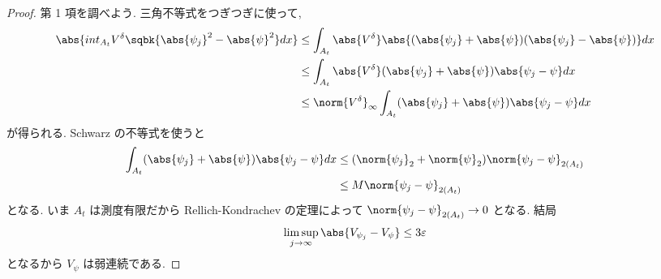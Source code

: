 \documentclass[openany, a4paper, oneside]{jsbook}
\begin{document}
\begin{proof}
第 1 項を調べよう.
三角不等式をつぎつぎに使って,
\begin{align}
 \abs{int_{A_t} V^{\delta} \sqbk{\abs{\psi_j}^2 - \abs{\psi}^2} dx}
 &\leq
 \int_{A_t} \abs{V^{\delta}} \abs{(\abs{\psi_j} + \abs{\psi}) (\abs{\psi_j} - \abs{\psi})} dx \\
 &\leq
 \int_{A_t} \abs{V^{\delta}} (\abs{\psi_j} + \abs{\psi}) \abs{\psi_j - \psi} dx \\
 &\leq
 \norm{V^{\delta}}_{\infty} \int_{A_t} (\abs{\psi_j} + \abs{\psi}) \abs{\psi_j - \psi} dx
\end{align}
が得られる.
Schwarz の不等式を使うと
\begin{align}
 \int_{A_t} (\abs{\psi_j} + \abs{\psi}) \abs{\psi_j - \psi} dx
 &\leq
 (\norm{\psi_j}_2 + \norm{\psi}_2) \norm{\psi_j - \psi}_{2(A_t)} \\
 &\leq
 M \norm{\psi_j - \psi}_{2(A_t)}
\end{align}
となる.
いま $A_t$ は測度有限だから Rellich-Kondrachev の定理によって
$\norm{\psi_j - \psi}_{2(A_t)} \to 0$ となる.
結局
\begin{align}
 \limsup_{j \to \infty} \abs{V_{\psi_j} - V_{\psi}}
 \leq
 3 \varepsilon
\end{align}
となるから $V_{\psi}$ は弱連続である.
\end{proof}
\end{document}
